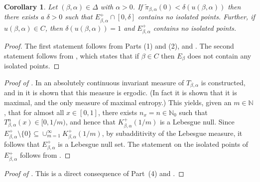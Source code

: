 \documentclass[a4paper,reqno,10pt]{amsart}
\newtheorem{corollary}[theorem]{Corollary}
\begin{document}
\begin{corollary}\label{cor:isoloated_pts}
Let $(\beta,\alpha)\in \Delta$ with $\alpha>0$.  If $\tilde{\pi}_{\beta,\alpha}(0)<\delta(u(\beta,\alpha))$ then there exists a $\delta>0$ such that $E_{\beta,\alpha}^+\cap[0,\delta]$ contains no isolated points. Further, if $u(\beta,\alpha) \in C$, then $\delta(u(\beta,\alpha))=1$ and $E_{\beta,\alpha}^+$ contains no isolated points.
\end{corollary}

\begin{proof}
The first statement follows from  Parts (1) and (2), and \cite[Theorem 3.12]{KKLL}.  The second statement follows from \cite[Theorem 3]{KKLL}, which states that if $\beta\in C$ then $E_\beta$ does not contain any isolated points.
\end{proof}

\begin{proof}[Proof of \texorpdfstring{}{Corollary 1.3}]
In \cite{MR0166332} an absolutely continuous invariant measure of $T_{\beta,\alpha}$ is constructed, and in \cite{Hof} it is shown that this measure is ergodic. (In fact it is shown that it is maximal, and the only measure of maximal entropy.)  This yields, given an $m \in \mathbb{N}$, that for almost all $x \in [0,1]$, there exists $n_{x} = n \in \mathbb{N}_{0}$ such that $T_{\beta,\alpha}^{n}(x) \in [0, 1/m)$, and hence that $K_{\beta,\alpha}^{+}(1/m)$ is a Lebesgue null. Since $E_{\beta,\alpha}^{+} \setminus \{0\} \subseteq \cup_{m=1}^{\infty} K_{\beta,\alpha}^{+}(1/m)$, by subadditivity of the Lebesgue measure, it follows that $E_{\beta,\alpha}^{+}$ is a Lebesgue null set. The statement on the isolated points of $E_{\beta,\alpha}^{+}$ follows from .
\end{proof}

\begin{proof}[Proof of \texorpdfstring{}{Corollary 1.4}]
This is a direct consequence of  Part~(4) and \cite[Theorem~A (ii)]{KKLL}.
\end{proof}
\end{document}
